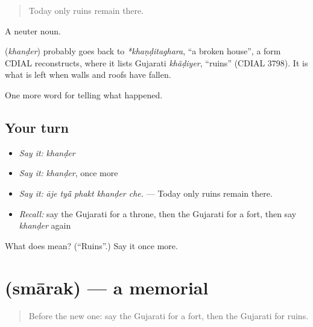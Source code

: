 \begin{quote}
Today only ruins remain there.
\end{quote}

A neuter noun.

\begin{cousinweb}
\textbf{} (\emph{khanḍer}) probably goes back to \emph{*khaṇḍitaghara}, \textquotedblleft{}a broken house\textquotedblright{}, a form CDIAL reconstructs, where it lists Gujarati \emph{khãḍiyer}, \textquotedblleft{}ruins\textquotedblright{} (CDIAL 3798). It is what is left when walls and roofs have fallen.
\end{cousinweb}

\begin{grammarlens}[title={What you've built}]
One more word for telling what happened.
\end{grammarlens}

\subsection*{Your turn}
\begin{itemize}
\raggedright
  \item \emph{Say it:} \emph{khanḍer}
  \item \emph{Say it:} \emph{khanḍer}, once more
  \item \emph{Say it:} \emph{āje tyā̃ phakt khanḍer che.} — Today only ruins remain there.
  \item \emph{Recall:} say the Gujarati for a throne, then the Gujarati for a fort, then say \emph{khanḍer} again
\end{itemize}

\begin{tcolorbox}[breakable,colback=teal!4,colframe=teal!35!black,title={Before you move on}]
What does  mean? (\textquotedblleft{}Ruins\textquotedblright{}.) Say it once more.
\end{tcolorbox}
\section[\texorpdfstring{\gu{સ્મારક} (smārak)}{સ્મારક (smārak)}]{ (smārak) — a memorial}

\label{lesson:GU-C319-smarak}



\begin{quote}
Before the new one: say the Gujarati for a fort, then the Gujarati for ruins.
\end{quote}

